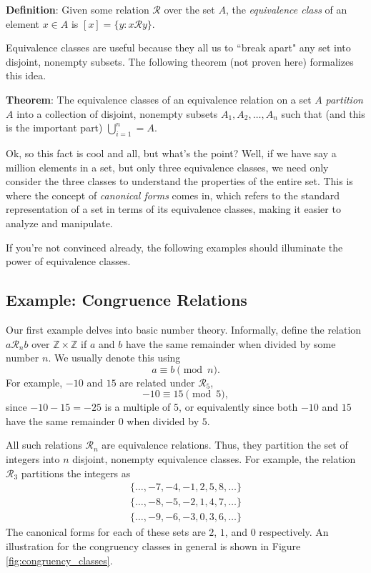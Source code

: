 \documentclass{article}
\begin{document}
    \vspace{2mm}
    \textbf{Definition}: Given some relation $\mathcal{R}$ over the set $A$, the \textit{equivalence class} of an element $x \in A$ is $[x] = \{y : x \mathcal{R} y\}$.

    \vspace{2mm}

    Equivalence classes are useful because they all us to ``break apart" any set into disjoint, nonempty subsets. The following theorem (not proven here) formalizes this idea.

    \begin{tcolorbox}
        \textbf{Theorem}: The equivalence classes of an equivalence relation on a set $A$ \textit{partition} $A$ into a collection of disjoint, nonempty subsets $A_{1}, A_{2}, \dots, A_{n}$ such that (and this is the important part) $\bigcup _{i = 1}^{n} = A$.
    \end{tcolorbox}
    
    \vspace{2mm}
    Ok, so this fact is cool and all, but what's the point? Well, if we have say a million elements in a set, but only three equivalence classes, we need only consider the three classes to understand the properties of the entire set. This is where the concept of \textit{canonical forms} comes in, which refers to the standard representation of a set in terms of its equivalence classes, making it easier to analyze and manipulate.
    
    \vspace{2mm}If you're not convinced already, the following examples should illuminate the power of equivalence classes.

    \subsection*{Example: Congruence Relations}
        Our first example delves into basic number theory. Informally, define the relation $a\mathcal{R}_{n}b$ over $\mathbb{Z} \times \mathbb{Z}$ if $a$ and $b$ have the same remainder when divided by some number $n$. We usually denote this using $$a \equiv b \pmod{n}.$$ For example, $-10$ and $15$ are related under $\mathcal{R}_{5}$, $$-10 \equiv 15 \pmod{5},$$ since $-10 - 15 = -25$ is a multiple of $5$, or equivalently since both $-10$ and $15$ have the same remainder $0$ when divided by $5$.
        
        \vspace{2mm}
        All such relations $\mathcal{R}_{n}$ are equivalence relations. Thus, they partition the set of integers into $n$ disjoint, nonempty equivalence classes. For example, the relation $\mathcal{R}_{3}$ partitions the integers as
        \begin{gather*}
            \{\dots, -7, -4, -1, 2, 5, 8, \dots\} \\
            \{\dots, -8, -5, -2, 1, 4, 7, \dots\} \\
            \{\dots, -9, -6, -3, 0, 3, 6, \dots\}
        \end{gather*}
        The canonical forms for each of these sets are $2$, $1$, and $0$ respectively. An illustration for the congruency classes in general is shown in Figure \ref*{fig:congruency_classes}.
\end{document}
